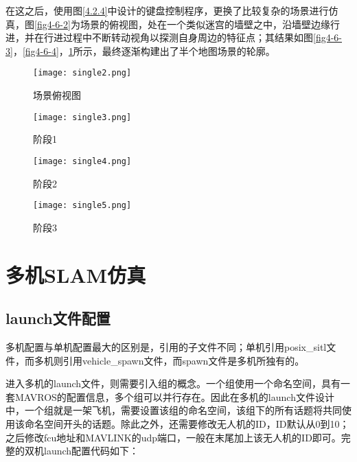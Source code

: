 在这之后，使用图\ref{4.2.4}中设计的键盘控制程序，更换了比较复杂的场景进行仿真，图\ref{fig4-6-2}为场景的俯视图，处在一个类似迷宫的墙壁之中，沿墙壁边缘行进，并在行进过程中不断转动视角以探测自身周边的特征点；其结果如图\ref{fig4-6-3}，\ref{fig4-6-4}，\ref{fig4-6-5}所示，最终逐渐构建出了半个地图场景的轮廓。

\begin{figure}[htbp]
	\centering
	\begin{minipage}[t]{0.24\columnwidth} %
		\centering
		\texttt{[image: single2.png]}
		\caption{场景俯视图}
		\label{fig4-6-2}
	\end{minipage}
	\begin{minipage}[t]{0.24\columnwidth}
		\centering
		\texttt{[image: single3.png]}
		\caption{阶段1}
		\label{fig4-6-3}
	\end{minipage}
	\begin{minipage}[t]{0.24\columnwidth}
		\centering
		\texttt{[image: single4.png]}
		\caption{阶段2}
		\label{fig4-6-4}
	\end{minipage}
	\begin{minipage}[t]{0.24\columnwidth}
		\centering
		\texttt{[image: single5.png]}
		\caption{阶段3}
		\label{fig4-6-5}
	\end{minipage}
\end{figure}


\section{多机SLAM仿真}


\subsection{launch文件配置} \label{4.3.1}

多机配置与单机配置最大的区别是，引用的子文件不同；单机引用posix\_sitl文件，而多机则引用vehicle\_spawn文件，而spawn文件是多机所独有的。

进入多机的launch文件，则需要引入组的概念。一个组使用一个命名空间，具有一套MAVROS的配置信息，多个组可以并行存在。因此在多机的launch文件设计中，一个组就是一架飞机，需要设置该组的命名空间，该组下的所有话题将共同使用该命名空间开头的话题。除此之外，还需要修改无人机的ID，ID默认从0到10；之后修改fcu地址和MAVLINK的udp端口，一般在末尾加上该无人机的ID即可。完整的双机launch配置代码如下：

